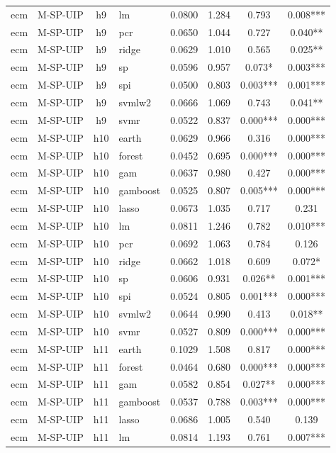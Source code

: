 \begin{ThreePartTable}
\begin{longtable}[t]{llclcccc}
ecm & M-SP-UIP & h9 & lm & 0.0800 & 1.284 & 0.793 & 0.008***\\
ecm & M-SP-UIP & h9 & pcr & 0.0650 & 1.044 & 0.727 & 0.040**\\
ecm & M-SP-UIP & h9 & ridge & 0.0629 & 1.010 & 0.565 & 0.025**\\
ecm & M-SP-UIP & h9 & sp & 0.0596 & 0.957 & 0.073* & 0.003***\\
ecm & M-SP-UIP & h9 & spi & 0.0500 & 0.803 & 0.003*** & 0.001***\\
ecm & M-SP-UIP & h9 & svmlw2 & 0.0666 & 1.069 & 0.743 & 0.041**\\
ecm & M-SP-UIP & h9 & svmr & 0.0522 & 0.837 & 0.000*** & 0.000***\\
\addlinespace
ecm & M-SP-UIP & h10 & earth & 0.0629 & 0.966 & 0.316 & 0.000***\\
ecm & M-SP-UIP & h10 & forest & 0.0452 & 0.695 & 0.000*** & 0.000***\\
ecm & M-SP-UIP & h10 & gam & 0.0637 & 0.980 & 0.427 & 0.000***\\
ecm & M-SP-UIP & h10 & gamboost & 0.0525 & 0.807 & 0.005*** & 0.000***\\
ecm & M-SP-UIP & h10 & lasso & 0.0673 & 1.035 & 0.717 & 0.231\\
ecm & M-SP-UIP & h10 & lm & 0.0811 & 1.246 & 0.782 & 0.010***\\
ecm & M-SP-UIP & h10 & pcr & 0.0692 & 1.063 & 0.784 & 0.126\\
ecm & M-SP-UIP & h10 & ridge & 0.0662 & 1.018 & 0.609 & 0.072*\\
ecm & M-SP-UIP & h10 & sp & 0.0606 & 0.931 & 0.026** & 0.001***\\
ecm & M-SP-UIP & h10 & spi & 0.0524 & 0.805 & 0.001*** & 0.000***\\
ecm & M-SP-UIP & h10 & svmlw2 & 0.0644 & 0.990 & 0.413 & 0.018**\\
ecm & M-SP-UIP & h10 & svmr & 0.0527 & 0.809 & 0.000*** & 0.000***\\
\addlinespace
ecm & M-SP-UIP & h11 & earth & 0.1029 & 1.508 & 0.817 & 0.000***\\
ecm & M-SP-UIP & h11 & forest & 0.0464 & 0.680 & 0.000*** & 0.000***\\
ecm & M-SP-UIP & h11 & gam & 0.0582 & 0.854 & 0.027** & 0.000***\\
ecm & M-SP-UIP & h11 & gamboost & 0.0537 & 0.788 & 0.003*** & 0.000***\\
ecm & M-SP-UIP & h11 & lasso & 0.0686 & 1.005 & 0.540 & 0.139\\
ecm & M-SP-UIP & h11 & lm & 0.0814 & 1.193 & 0.761 & 0.007***\\

\end{longtable}
\end{ThreePartTable}
